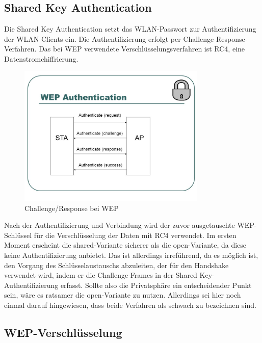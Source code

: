 	\subsection{Shared Key Authentication}
	Die Shared Key Authentication setzt das WLAN-Passwort zur Authentifizierung der WLAN Clients ein. Die Authentifizierung erfolgt per Challenge-Response-Verfahren. Das bei WEP verwendete Verschlüsselungsverfahren ist RC4, eine Datenstromchiffrierung. \\
		\begin{figure}[H]
			\centering
			\includegraphics[width=0.8\textwidth]{images/WLAN/WEPchres.jpg}
			\caption{Challenge/Response bei WEP}
			\label{fig:Challenge/Response bei WEP}
		\end{figure}
		
	\noindent Nach der Authentifizierung und Verbindung wird der zuvor ausgetauschte WEP-Schlüssel für die Verschlüsselung der Daten mit RC4 verwendet. Im ersten Moment erscheint die shared-Variante sicherer als die open-Variante, da diese keine Authentifizierung anbietet. Das ist allerdings irreführend, da es möglich ist, den Vorgang des Schlüsselaustauschs abzuleiten, der für den Handshake verwendet wird, indem er die Challenge-Frames in der Shared Key-Authentifizierung erfasst. Sollte also die Privatsphäre ein entscheidender Punkt sein, wäre es ratsamer die open-Variante zu nutzen. Allerdings sei hier noch einmal darauf hingewiesen, dass beide Verfahren als schwach zu bezeichnen sind.

	\subsection{WEP-Verschlüsselung}

